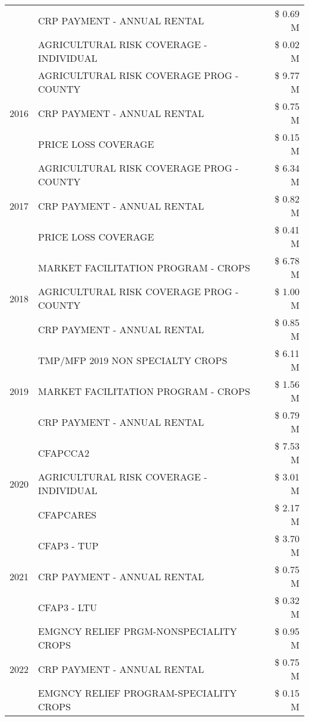 \begin{tabular}{llr}
 & CRP PAYMENT - ANNUAL RENTAL & \$ 0.69 M \\
 & AGRICULTURAL RISK COVERAGE - INDIVIDUAL & \$ 0.02 M \\
\cline{1-3}
\multirow[t]{3}{*}{2016} & AGRICULTURAL RISK COVERAGE PROG - COUNTY & \$ 9.77 M \\
 & CRP PAYMENT - ANNUAL RENTAL & \$ 0.75 M \\
 & PRICE LOSS COVERAGE & \$ 0.15 M \\
\cline{1-3}
\multirow[t]{3}{*}{2017} & AGRICULTURAL RISK COVERAGE PROG - COUNTY & \$ 6.34 M \\
 & CRP PAYMENT - ANNUAL RENTAL & \$ 0.82 M \\
 & PRICE LOSS COVERAGE & \$ 0.41 M \\
\cline{1-3}
\multirow[t]{3}{*}{2018} & MARKET FACILITATION PROGRAM - CROPS & \$ 6.78 M \\
 & AGRICULTURAL RISK COVERAGE PROG - COUNTY & \$ 1.00 M \\
 & CRP PAYMENT - ANNUAL RENTAL & \$ 0.85 M \\
\cline{1-3}
\multirow[t]{3}{*}{2019} & TMP/MFP 2019 NON SPECIALTY CROPS & \$ 6.11 M \\
 & MARKET FACILITATION PROGRAM - CROPS & \$ 1.56 M \\
 & CRP PAYMENT - ANNUAL RENTAL & \$ 0.79 M \\
\cline{1-3}
\multirow[t]{3}{*}{2020} & CFAPCCA2 & \$ 7.53 M \\
 & AGRICULTURAL RISK COVERAGE - INDIVIDUAL & \$ 3.01 M \\
 & CFAPCARES & \$ 2.17 M \\
\cline{1-3}
\multirow[t]{3}{*}{2021} & CFAP3 - TUP & \$ 3.70 M \\
 & CRP PAYMENT - ANNUAL RENTAL & \$ 0.75 M \\
 & CFAP3 - LTU & \$ 0.32 M \\
\cline{1-3}
\multirow[t]{3}{*}{2022} & EMGNCY RELIEF PRGM-NONSPECIALITY CROPS & \$ 0.95 M \\
 & CRP PAYMENT - ANNUAL RENTAL & \$ 0.75 M \\
 & EMGNCY RELIEF PROGRAM-SPECIALITY CROPS & \$ 0.15 M \\
\cline{1-3}
\bottomrule
\end{tabular}
